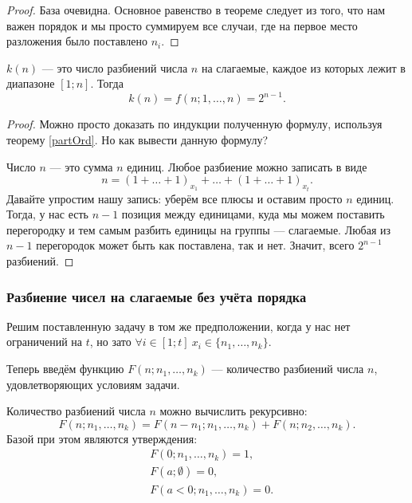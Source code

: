 \begin{proof}
	База очевидна. Основное равенство в теореме следует из того, что нам важен порядок и мы просто суммируем все случаи, где на первое место разложения было поставлено $n_i$.
\end{proof}

\begin{corollary}
	$k(n)$ --- это число разбиений числа $n$ на слагаемые, каждое из которых лежит в диапазоне $[1; n]$. Тогда
	\[
		k(n) = f(n; 1, \ldots, n) = 2^{n - 1}.
	\]
\end{corollary}

\begin{proof}
	Можно просто доказать по индукции полученную формулу, используя теорему \ref{partOrd}. Но как вывести данную формулу?
	
	Число $n$ --- это сумма $n$ единиц. Любое разбиение можно записать в виде
	\[
		n = (1 + \ldots + 1)_{x_1} + \ldots + (1 + \ldots + 1)_{x_t}.
	\]
	Давайте упростим нашу запись: уберём все плюсы и оставим просто $n$ единиц. Тогда, у нас есть $n - 1$ позиция между единицами, куда мы можем поставить перегородку и тем самым разбить единицы на группы --- слагаемые. Любая из $n - 1$ перегородок может быть как поставлена, так и нет. Значит, всего $2^{n - 1}$ разбиений.
\end{proof}

\subsubsection*{Разбиение чисел на слагаемые без учёта порядка}

Решим поставленную задачу в том же предположении, когда у нас нет ограничений на $t$, но зато $\forall i \in [1; t]\ x_i \in \{n_1, \ldots, n_k\}$.

Теперь введём функцию $F(n; n_1, \ldots, n_k)$ --- количество разбиений числа $n$, удовлетворяющих условиям задачи.

\begin{theorem}
	Количество разбиений числа $n$ можно вычислить рекурсивно:
	\[
		F(n; n_1, \ldots, n_k) = F(n - n_1; n_1, \ldots, n_k) + F(n; n_2, \ldots, n_k).
	\]
	Базой при этом являются утверждения:
	\begin{align*}
		&F(0; n_1, \ldots, n_k) = 1,
		\\
		&F(a; \emptyset) = 0,
		\\
		&F(a < 0; n_1, \ldots, n_k) = 0.
	\end{align*}
\end{theorem}

